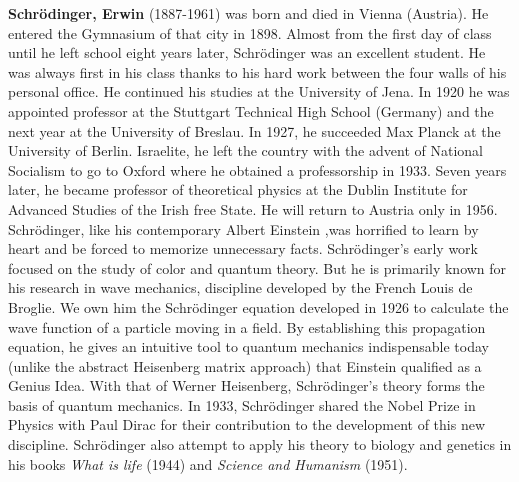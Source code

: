 \textbf{Schrödinger, Erwin} (1887-1961) was born and died in Vienna (Austria). He entered the Gymnasium of that city in 1898. Almost from the first day of class until he left school eight years later, Schrödinger was an excellent student. He was always first in his class thanks to his hard work between the four walls of his personal office. He continued his studies at the University of Jena. In 1920 he was appointed professor at the Stuttgart Technical High School (Germany) and the next year at the University of Breslau. In 1927, he succeeded Max Planck at the University of Berlin. Israelite, he left the country with the advent of National Socialism to go to Oxford where he obtained a professorship in 1933. Seven years later, he became professor of theoretical physics at the Dublin Institute for Advanced Studies of the Irish free State. He will return to Austria only in 1956. Schrödinger, like his contemporary Albert Einstein ,was horrified to learn by heart and be forced to memorize unnecessary facts. Schrödinger's early work focused on the study of color and quantum theory. But he is primarily known for his research in wave mechanics, discipline developed by the French Louis de Broglie. We own him the Schrödinger equation developed in 1926 to calculate the wave function of a particle moving in a field. By establishing this propagation equation, he gives an intuitive tool to quantum mechanics indispensable today (unlike the abstract Heisenberg matrix approach) that Einstein qualified as a Genius Idea. With that of Werner Heisenberg, Schrödinger's theory forms the basis of quantum mechanics. In 1933, Schrödinger shared the Nobel Prize in Physics with Paul Dirac for their contribution to the development of this new discipline. Schrödinger also attempt to apply his theory to biology and genetics in his books \textit{What is life} (1944) and \textit{Science and Humanism} (1951).

